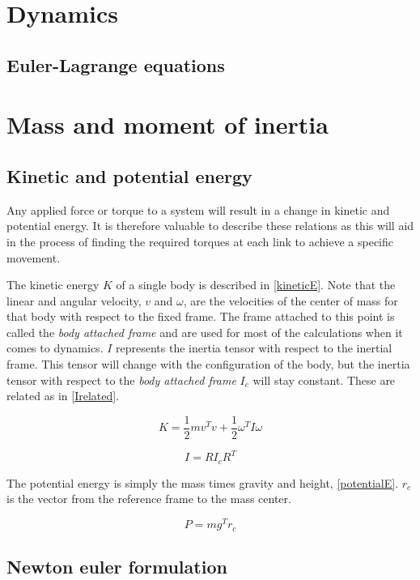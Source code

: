 \section{Dynamics}
\lipsum[1]
\subsection{Euler-Lagrange equations}

\section{Mass and moment of inertia}

\subsection{Kinetic and potential energy}

Any applied force or torque to a system will result in a change in kinetic and potential energy. It is therefore valuable to describe these relations as this will aid in the process of finding the required torques at each link to achieve a specific movement.

The kinetic energy $K$ of a single body is described in \eqref{kineticE}. Note that the linear and angular velocity, $v$ and $\omega$, are the velocities of the center of mass for that body with respect to the fixed frame. The frame attached to this point is called the \textit{body attached frame} and are used for most of the calculations when it comes to dynamics. $I$ represents the inertia tensor with respect to the inertial frame.  This tensor will change with the configuration of the body, but the inertia tensor with respect to the \textit{body attached frame} $I_c$ will stay constant. These are related as in \eqref{Irelated}.

\begin{equation}\label{kineticE}
K = \frac{1}{2}mv^Tv + \frac{1}{2}\omega ^{T}  I \omega
\end{equation}

\begin{equation}\label{Irelated}
I = RI_cR^T
\end{equation}

The potential energy is simply the mass times gravity and height, \eqref{potentialE}. $r_c$ is the vector from the reference frame to the mass center.

\begin{equation}\label{potentialE}
P = mg^Tr_c
\end{equation}



\subsection{Newton euler formulation}